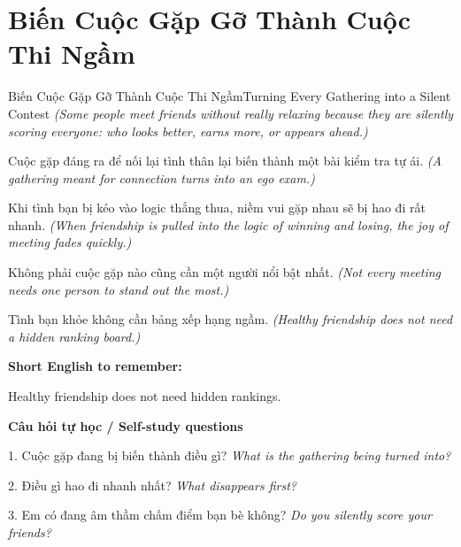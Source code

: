 \section{Biến Cuộc Gặp Gỡ Thành Cuộc Thi Ngầm}
\begin{truyen}{Biến Cuộc Gặp Gỡ Thành Cuộc Thi Ngầm}{Turning Every Gathering into a Silent Contest}
\textit{(Some people meet friends without really relaxing because they are silently scoring everyone: who looks better, earns more, or appears ahead.)}

Cuộc gặp đáng ra để nối lại tình thân lại biến thành một bài kiểm tra tự ái.
\textit{(A gathering meant for connection turns into an ego exam.)}

Khi tình bạn bị kéo vào logic thắng thua, niềm vui gặp nhau sẽ bị hao đi rất nhanh.
\textit{(When friendship is pulled into the logic of winning and losing, the joy of meeting fades quickly.)}

Không phải cuộc gặp nào cũng cần một người nổi bật nhất.
\textit{(Not every meeting needs one person to stand out the most.)}

\end{truyen}

\begin{baihoc}
Tình bạn khỏe không cần bảng xếp hạng ngầm.
\textit{(Healthy friendship does not need a hidden ranking board.)}
\end{baihoc}

\begin{ghinhoanh}
\textbf{Short English to remember:}

Healthy friendship does not need hidden rankings.

\end{ghinhoanh}

\begin{tuhocnhanh}
\textbf{Câu hỏi tự học / Self-study questions}

1. Cuộc gặp đang bị biến thành điều gì? \textit{What is the gathering being turned into?}

2. Điều gì hao đi nhanh nhất? \textit{What disappears first?}

3. Em có đang âm thầm chấm điểm bạn bè không? \textit{Do you silently score your friends?}
\end{tuhocnhanh}
\ngancach


